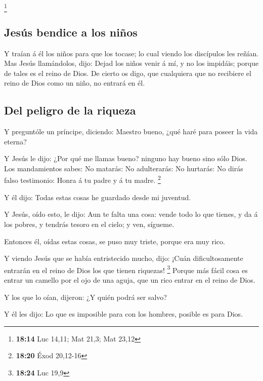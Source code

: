 \footnote{\textbf{18:14} Luc 14,11; Mat 21,3; Mat 23,12}

\hypertarget{jesuxfas-bendice-a-los-niuxf1os}{%
\subsection{Jesús bendice a los
niños}\label{jesuxfas-bendice-a-los-niuxf1os}}

 Y traían á él los niños para que los tocase; lo cual
viendo los discípulos les reñían.  Mas Jesús llamándolos,
dijo: Dejad los niños venir á mí, y no los impidáis; porque de tales es
el reino de Dios.  De cierto os digo, que cualquiera que
no recibiere el reino de Dios como un niño, no entrará en él.

\hypertarget{del-peligro-de-la-riqueza}{%
\subsection{Del peligro de la riqueza}\label{del-peligro-de-la-riqueza}}

 Y preguntóle un príncipe, diciendo: Maestro bueno, ¿qué
haré para poseer la vida eterna?

 Y Jesús le dijo: ¿Por qué me llamas bueno? ninguno hay
bueno sino sólo Dios.  Los mandamientos sabes: No
matarás: No adulterarás: No hurtarás: No dirás falso testimonio: Honra á
tu padre y á tu madre. \footnote{\textbf{18:20} Éxod 20,12-16}

 Y él dijo: Todas estas cosas he guardado desde mi
juventud.

 Y Jesús, oído esto, le dijo: Aun te falta una cosa:
vende todo lo que tienes, y da á los pobres, y tendrás tesoro en el
cielo; y ven, sígueme.

 Entonces él, oídas estas cosas, se puso muy triste,
porque era muy rico.

 Y viendo Jesús que se había entristecido mucho, dijo:
¡Cuán dificultosamente entrarán en el reino de Dios los que tienen
riquezas! \footnote{\textbf{18:24} Luc 19,9}  Porque más
fácil cosa es entrar un camello por el ojo de una aguja, que un rico
entrar en el reino de Dios.

 Y los que lo oían, dijeron: ¿Y quién podrá ser salvo?

 Y él les dijo: Lo que es imposible para con los hombres,
posible es para Dios.


